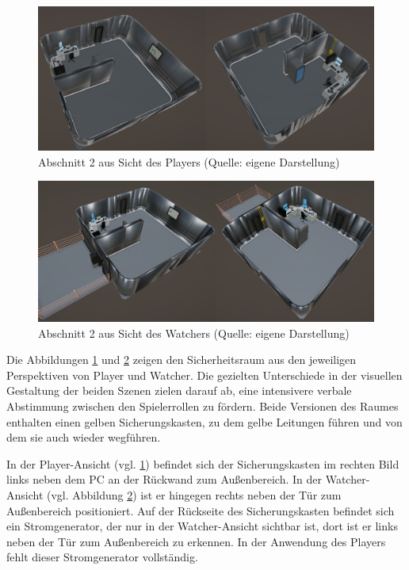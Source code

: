\begin{figure}[ht]
\centering
\includegraphics[width=1\linewidth]{content/pictures/Abschnitt_01 - Player.png}
\caption{Abschnitt 2 aus Sicht des Players (Quelle: eigene Darstellung)}
\label{fig:section_01_player}
\end{figure}

\begin{figure}[ht]
\centering
\includegraphics[width=1\linewidth]{content/pictures/Abschnitt_01 - Watcher.png}
\caption{Abschnitt 2 aus Sicht des Watchers (Quelle: eigene Darstellung)}
\label{fig:section_01_watcher}
\end{figure}

Die Abbildungen \ref{fig:section_01_player} und \ref{fig:section_01_watcher} zeigen den Sicherheitsraum aus den jeweiligen Perspektiven von Player und Watcher. Die gezielten Unterschiede in der visuellen Gestaltung der beiden Szenen zielen darauf ab, eine intensivere verbale Abstimmung zwischen den Spielerrollen zu fördern. Beide Versionen des Raumes enthalten einen gelben Sicherungskasten, zu dem gelbe Leitungen führen und von dem sie auch wieder wegführen.

In der Player-Ansicht (vgl. \ref{fig:section_01_player}) befindet sich der Sicherungskasten im rechten Bild links neben dem PC an der Rückwand zum Außenbereich. In der Watcher-Ansicht (vgl. Abbildung \ref{fig:section_01_watcher}) ist er hingegen rechts neben der Tür zum Außenbereich positioniert. Auf der Rückseite des Sicherungskasten befindet sich ein Stromgenerator, der nur in der Watcher-Ansicht sichtbar ist, dort ist er links neben der Tür zum Außenbereich zu erkennen. In der Anwendung des Players fehlt dieser Stromgenerator vollständig.

